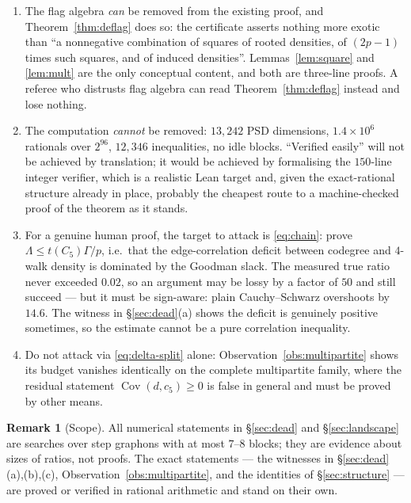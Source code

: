 \documentclass[11pt]{article}
\theoremstyle{definition}
\newtheorem{remark}[theorem]{Remark}
\newcommand{\Cov}{\operatorname{Cov}}
\begin{document}
\begin{enumerate}[leftmargin=1.6em]
\item The flag algebra \emph{can} be removed from the existing proof, and
Theorem~\ref{thm:deflag} does so: the certificate asserts nothing more exotic
than ``a nonnegative combination of squares of rooted densities, of $(2p-1)$
times such squares, and of induced densities''.  Lemmas~\ref{lem:square} and
\ref{lem:mult} are the only conceptual content, and both are three-line proofs.
A referee who distrusts flag algebra can read Theorem~\ref{thm:deflag} instead
and lose nothing.
\item The computation \emph{cannot} be removed: $13{,}242$ PSD dimensions,
$1.4\times10^6$ rationals over $2^{96}$, $12{,}346$ inequalities, no idle
blocks.  ``Verified easily'' will not be achieved by translation; it would be
achieved by formalising the $150$-line integer verifier, which is a realistic
Lean target and, given the exact-rational structure already in place, probably
the cheapest route to a machine-checked proof of the theorem as it stands.
\item For a genuine human proof, the target to attack is \eqref{eq:chain}:
prove $\Lambda\le t(C_5)\Gamma/p$, i.e.\ that the edge-correlation deficit
between codegree and $4$-walk density is dominated by the Goodman slack.  The
measured true ratio never exceeded $0.02$, so an argument may be lossy by a
factor of $50$ and still succeed --- but it must be sign-aware: plain
Cauchy--Schwarz overshoots by $14.6$.  The witness in \S\ref{sec:dead}(a) shows
the deficit is genuinely positive sometimes, so the estimate cannot be a pure
correlation inequality.
\item Do not attack via \eqref{eq:delta-split} alone:
Observation~\ref{obs:multipartite} shows its budget vanishes identically on the
complete multipartite family, where the residual statement
$\Cov(d,c_5)\ge0$ is false in general and must be proved by other means.
\end{enumerate}

\begin{remark}[Scope]
All numerical statements in \S\ref{sec:dead} and \S\ref{sec:landscape} are
searches over step graphons with at most $7$--$8$ blocks; they are evidence
about sizes of ratios, not proofs.  The exact statements --- the witnesses in
\S\ref{sec:dead}(a),(b),(c), Observation~\ref{obs:multipartite}, and the
identities of \S\ref{sec:structure} --- are proved or verified in rational
arithmetic and stand on their own.
\end{remark}
\end{document}
